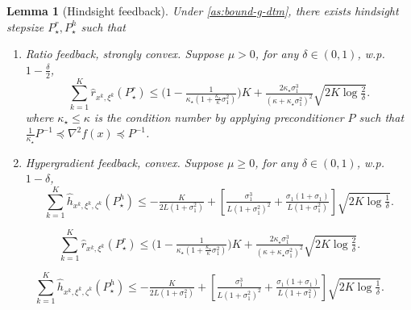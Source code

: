 \documentclass[10pt,a4paper]{amsart}
\newtheorem{lemma}{Lemma}
\begin{document}
\begin{lemma}[Hindsight feedback]
  \label{lem:hindsight}
  Under \cref{as:bound-g-dtm},
  there exists hindsight stepsize $P_{\star}^r, P^h_{\star}$ such that
  \begin{enumerate}
    \item Ratio feedback, strongly convex. Suppose $\mu > 0$, for any $\delta
    \in (0, 1)$, w.p. $1 - \frac{\delta}{2}$,
    \begin{equation}
      \textstyle \sum_{k = 1}^K \hat{r}_{x^k, \xi^k} (P^r_{\star}) \leq \big( 1 -
      \tfrac{1}{\kappa_{\star} \left( 1 + \frac{\kappa_{\star}}{\kappa}
      \sigma_1^2 \right)} \big) K + \tfrac{2 \kappa_{\star}
      \sigma_1^3}{(\kappa + \kappa_{\star} \sigma_1^2)^2} \sqrt{2 K \log
      \tfrac{2}{\delta}} . \label{eq:ratio-hindsight}
    \end{equation}
    where $\kappa_{\star} \leq \kappa$ is the condition number by applying preconditioner $P$ such that $\tfrac{1}{\kappa_{\star}} P^{- 1}
    \preceq \nabla^2 f (x) \preceq P^{- 1}$.
    
    \item Hypergradient feedback, convex. Suppose $\mu \geq 0$, for any
    $\delta \in (0, 1)$, w.p. $1 - \delta$,
    \begin{equation}
      \textstyle \sum_{k = 1}^K \hat{h}_{x^k, \xi^k, \zeta^k} (P^h_{\star}) \leq -
      \tfrac{K}{2 L (1 + \sigma_1^2)} + \left[ \tfrac{\sigma_1^3}{L (1 +
      \sigma_1^2)^2} + \tfrac{\sigma_1 (1 + \sigma_1)}{L (1 + \sigma_1^2)}
      \right] \sqrt{2 K \log \tfrac{1}{\delta}} . \label{eq:hyper-hindsight}
    \end{equation}
  \end{enumerate}
\end{lemma}

    \begin{equation}
      \textstyle \sum_{k = 1}^K \hat{r}_{x^k, \xi^k} (P^r_{\star}) \leq \big( 1 -
      \tfrac{1}{\kappa_{\star} \left( 1 + \frac{\kappa_{\star}}{\kappa}
      \sigma_1^2 \right)} \big) K + \tfrac{2 \kappa_{\star}
      \sigma_1^3}{(\kappa + \kappa_{\star} \sigma_1^2)^2} \sqrt{2 K \log
      \tfrac{2}{\delta}} . 
    \end{equation}

    \begin{equation}
      \textstyle \sum_{k = 1}^K \hat{h}_{x^k, \xi^k, \zeta^k} (P^h_{\star}) \leq -
      \tfrac{K}{2 L (1 + \sigma_1^2)} + \left[ \tfrac{\sigma_1^3}{L (1 +
      \sigma_1^2)^2} + \tfrac{\sigma_1 (1 + \sigma_1)}{L (1 + \sigma_1^2)}
      \right] \sqrt{2 K \log \tfrac{1}{\delta}} . 
    \end{equation}
\end{document}
